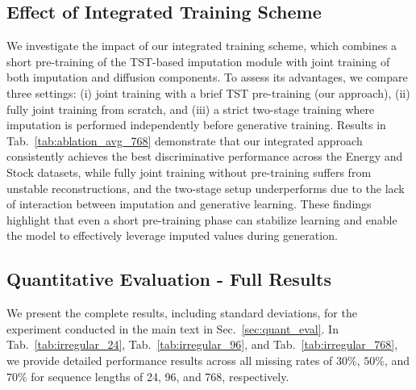 \documentclass{article}
\theoremstyle{plain}
\theoremstyle{definition}
\theoremstyle{remark}
\begin{document}
\subsection{Effect of Integrated Training Scheme}
\label{sec:training_scheme}
We investigate the impact of our integrated training scheme, which combines a short pre-training of the TST-based imputation module with joint training of both imputation and diffusion components. To assess its advantages, we compare three settings: (i) joint training with a brief TST pre-training (our approach), (ii) fully joint training from scratch, and (iii) a strict two-stage training where imputation is performed independently before generative training. Results in Tab.~\ref{tab:ablation_avg_768} demonstrate that our integrated approach consistently achieves the best discriminative performance across the Energy and Stock datasets, while fully joint training without pre-training suffers from unstable reconstructions, and the two-stage setup underperforms due to the lack of interaction between imputation and generative learning. These findings highlight that even a short pre-training phase can stabilize learning and enable the model to effectively leverage imputed values during generation.


\begin{table}[t]
\renewcommand{\arraystretch}{1}
\centering
\caption{Average discriminative scores across 30\%, 50\%, and 70\% drop-rates on the Energy and Stock datasets for sequence length of $768$.}
\label{tab:ablation_avg_768}
\end{table}


\subsection{Quantitative Evaluation - Full Results}
\label{sec:quant_eval_full}

We present the complete results, including standard deviations, for the experiment conducted in the main text in Sec.~\ref{sec:quant_eval}. In Tab.~\ref{tab:irregular_24}, Tab.~\ref{tab:irregular_96}, and Tab.~\ref{tab:irregular_768}, we provide detailed performance results across all missing rates of $30\%$, $50\%$, and $70\%$ for sequence lengths of 24, 96, and 768, respectively.
\end{document}
